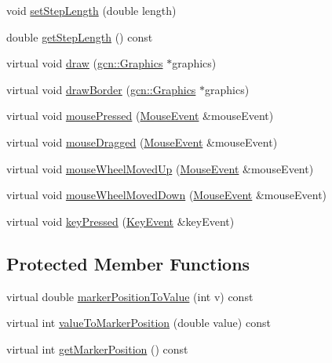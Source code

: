 \begin{DoxyCompactItemize}
void \hyperlink{classgcn_1_1Slider_a1399b4b758f4d27cec9ee7fa0926c45f}{set\+Step\+Length} (double length)
\item 
double \hyperlink{classgcn_1_1Slider_a9c28ad274c2a5e08fd8572acea4015b6}{get\+Step\+Length} () const 
\item 
virtual void \hyperlink{classgcn_1_1Slider_a2284be82a3eaceecf2b5bad2837fd44c}{draw} (\hyperlink{classgcn_1_1Graphics}{gcn\+::\+Graphics} $\ast$graphics)
\item 
virtual void \hyperlink{classgcn_1_1Slider_a5dd11fc4d4253c2c353f319042d3cf23}{draw\+Border} (\hyperlink{classgcn_1_1Graphics}{gcn\+::\+Graphics} $\ast$graphics)
\item 
virtual void \hyperlink{classgcn_1_1Slider_ac3fd6424383a1def58c0546b6d7dd4a5}{mouse\+Pressed} (\hyperlink{classgcn_1_1MouseEvent}{Mouse\+Event} \&mouse\+Event)
\item 
virtual void \hyperlink{classgcn_1_1Slider_ae9b0df67dbdadfd0d1924fa1ea9402d8}{mouse\+Dragged} (\hyperlink{classgcn_1_1MouseEvent}{Mouse\+Event} \&mouse\+Event)
\item 
virtual void \hyperlink{classgcn_1_1Slider_ad6ba9302b5651adf32d4d6be1b04dd4f}{mouse\+Wheel\+Moved\+Up} (\hyperlink{classgcn_1_1MouseEvent}{Mouse\+Event} \&mouse\+Event)
\item 
virtual void \hyperlink{classgcn_1_1Slider_a828cb15f109ddba7ebd7a9dc8f92bbea}{mouse\+Wheel\+Moved\+Down} (\hyperlink{classgcn_1_1MouseEvent}{Mouse\+Event} \&mouse\+Event)
\item 
virtual void \hyperlink{classgcn_1_1Slider_a2b826c2b9267c532496562524adb08f8}{key\+Pressed} (\hyperlink{classgcn_1_1KeyEvent}{Key\+Event} \&key\+Event)
\end{DoxyCompactItemize}
\subsection*{Protected Member Functions}
\begin{DoxyCompactItemize}
\item 
virtual double \hyperlink{classgcn_1_1Slider_ad77654ea049c10b6dd4f1fa0706ad10b}{marker\+Position\+To\+Value} (int v) const 
\item 
virtual int \hyperlink{classgcn_1_1Slider_a9224e1a0be1ff573e71bd1daf40890be}{value\+To\+Marker\+Position} (double value) const 
\item 
virtual int \hyperlink{classgcn_1_1Slider_aad4b277a3b2df3efd0bab5cf4926f02f}{get\+Marker\+Position} () const 
\end{DoxyCompactItemize}
